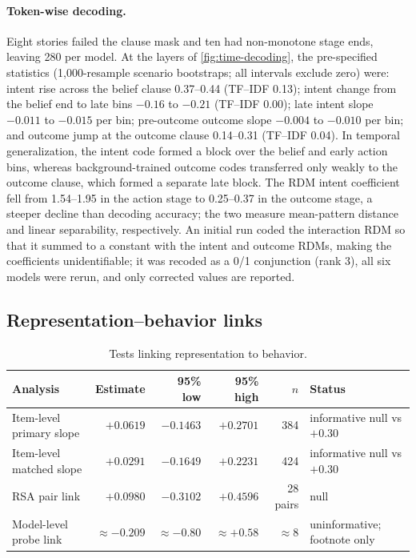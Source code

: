 \paragraph{Token-wise decoding.}
Eight stories failed the clause mask and ten had non-monotone stage ends, leaving 280 per model.
At the layers of \cref{fig:time-decoding}, the pre-specified statistics (1{,}000-resample scenario bootstraps; all intervals exclude zero) were: intent rise across the belief clause 0.37--0.44 (TF--IDF 0.13); intent change from the belief end to late bins $-0.16$ to $-0.21$ (TF--IDF 0.00); late intent slope $-0.011$ to $-0.015$ per bin; pre-outcome outcome slope $-0.004$ to $-0.010$ per bin; and outcome jump at the outcome clause 0.14--0.31 (TF--IDF 0.04).
In temporal generalization, the intent code formed a block over the belief and early action bins, whereas background-trained outcome codes transferred only weakly to the outcome clause, which formed a separate late block.
The RDM intent coefficient fell from 1.54--1.95 in the action stage to 0.25--0.37 in the outcome stage, a steeper decline than decoding accuracy; the two measure mean-pattern distance and linear separability, respectively.
An initial run coded the interaction RDM so that it summed to a constant with the intent and outcome RDMs, making the coefficients unidentifiable; it was recoded as a 0/1 conjunction (rank 3), all six models were rerun, and only corrected values are reported.

\subsection{Representation--behavior links}

\begin{table}[h]
\centering
\footnotesize
\caption{Tests linking representation to behavior.}
\label{tab:representation-links}
\begin{tabularx}{\textwidth}{@{}XrrrrX@{}}
\toprule
Analysis & Estimate & 95\% low & 95\% high & $n$ & Status \\
\midrule
Item-level primary slope & $+0.0619$ & $-0.1463$ & $+0.2701$ & 384 & informative null vs $+0.30$ \\
Item-level matched slope & $+0.0291$ & $-0.1649$ & $+0.2231$ & 424 & informative null vs $+0.30$ \\
RSA pair link & $+0.0980$ & $-0.3102$ & $+0.4596$ & 28 pairs & null \\
Model-level probe link & $\approx-0.209$ & $\approx-0.80$ & $\approx+0.58$ & $\approx8$ & uninformative; footnote only \\
\bottomrule
\end{tabularx}
\end{table}

